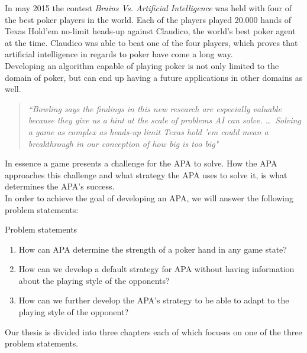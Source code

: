 In may 2015 the contest \textit{Brains Vs. Artificial Intelligence} \cite{brain-vs-ai} was held with four of the best poker players in the world. Each of the players played 20.000 hands of Texas Hold'em no-limit heads-up against Claudico, the world's best poker agent at the time. Claudico was able to beat one of the four players, which proves that artificial intelligence in regards to poker have come a long way.\\

Developing an algorithm capable of playing poker is not only limited to the domain of poker, but can end up having a future applications in other domains as well.

\begin{quotation}
\textit{``Bowling says the findings in this new research are especially valuable because they give us a hint at the scale of problems AI can solve. \ldots ~Solving a game as complex as heads-up limit Texas hold ’em could mean a breakthrough in our conception of how big is too big"} \cite{quote}
\end{quotation}

In essence a game presents a challenge for the APA to solve. How the APA approaches this challenge and what strategy the APA uses to solve it, is what determines the APA's success.\\

In order to achieve the goal of developing an APA, we will answer the following problem statements:

\vspace{4mm}
\begin{statementBox2}{Problem statements}
\begin{enumerate}
    \item \label{itm:q1} How can APA determine the strength of a poker hand in any game state? \label{itm:ps1}
    \item \label{itm:q2} How can we develop a default strategy for APA without having information about the playing style of the opponents? \label{itm:ps2}
    \item \label{itm:q3} How can we further develop the APA's strategy to be able to adapt to the playing style of the opponent? \label{itm:ps3}
  \end{enumerate}
\end{statementBox2}
\vspace{4mm}

Our thesis is divided into three chapters each of which focuses on one of the three problem statements.

